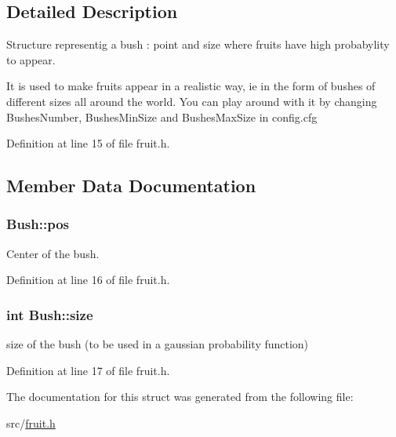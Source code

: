 \subsection{Detailed Description}
Structure representig a bush \-: point and size where fruits have high probabylity to appear. 

It is used to make fruits appear in a realistic way, ie in the form of bushes of different sizes all around the world. You can play around with it by changing Bushes\-Number, Bushes\-Min\-Size and Bushes\-Max\-Size in config.\-cfg 

Definition at line 15 of file fruit.\-h.



\subsection{Member Data Documentation}
\hypertarget{struct_bush_ab3135be5ff260f0e223cb9c64f4aedc3}{
\subsubsection[{pos}]{ Bush\-::pos}}\label{struct_bush_ab3135be5ff260f0e223cb9c64f4aedc3}


Center of the bush. 



Definition at line 16 of file fruit.\-h.

\hypertarget{struct_bush_a3b40c2cda3c709539246d302e74b8168}{
\subsubsection[{size}]{\setlength{\rightskip}{0pt plus 5cm}int Bush\-::size}}\label{struct_bush_a3b40c2cda3c709539246d302e74b8168}


size of the bush (to be used in a gaussian probability function) 



Definition at line 17 of file fruit.\-h.



The documentation for this struct was generated from the following file\-:\begin{DoxyCompactItemize}
\item 
src/\hyperlink{fruit_8h}{fruit.\-h}\end{DoxyCompactItemize}
